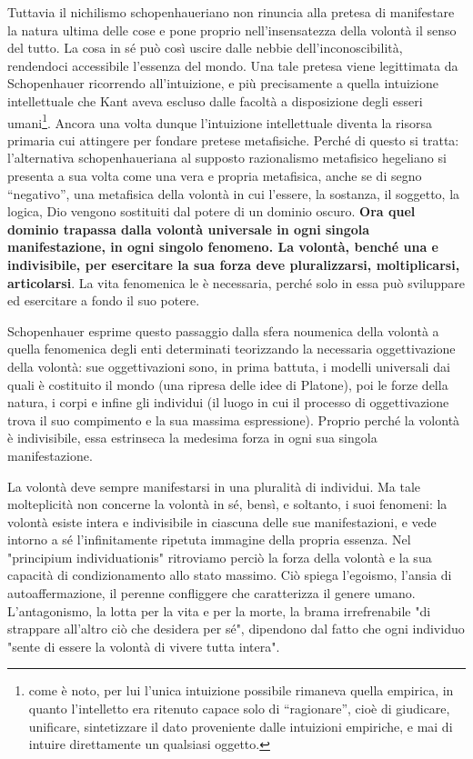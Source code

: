 Tuttavia il nichilismo schopenhaueriano non rinuncia alla pretesa di manifestare la natura ultima delle cose e pone proprio nell’insensatezza della volontà il senso del tutto. La cosa in sé può così uscire dalle nebbie dell’inconoscibilità, rendendoci accessibile l’essenza del mondo. Una tale pretesa viene legittimata da Schopenhauer ricorrendo all’intuizione, e più precisamente a quella intuizione intellettuale che Kant aveva escluso dalle facoltà a disposizione degli esseri umani\footnote{come è noto, per lui l’unica intuizione possibile rimaneva quella empirica, in quanto l’intelletto era ritenuto capace solo di “ragionare”, cioè di giudicare, unificare, sintetizzare il dato proveniente dalle intuizioni empiriche, e mai di intuire direttamente un qualsiasi oggetto.}.
Ancora una volta dunque l’intuizione intellettuale diventa la risorsa primaria cui attingere per fondare pretese metafisiche. Perché di questo si tratta: l’alternativa schopenhaueriana al supposto razionalismo metafisico hegeliano si presenta a sua volta come una vera e propria metafisica, anche se di segno “negativo”, una metafisica della volontà in cui l’essere, la sostanza, il soggetto, la logica, Dio vengono sostituiti dal potere di un dominio oscuro. \textbf{Ora quel dominio trapassa dalla volontà universale in ogni singola manifestazione, in ogni singolo fenomeno. La volontà, benché una e indivisibile, per esercitare la sua forza deve pluralizzarsi, moltiplicarsi, articolarsi}. La vita fenomenica le è necessaria, perché solo in essa può sviluppare ed esercitare a fondo il suo potere. 

Schopenhauer esprime questo passaggio dalla sfera noumenica della volontà a quella fenomenica degli enti determinati teorizzando la necessaria oggettivazione della volontà: sue oggettivazioni sono, in prima battuta, i modelli universali dai quali è costituito il mondo (una ripresa delle idee di Platone), poi le forze della natura, i corpi e infine gli individui (il luogo in cui il processo di oggettivazione trova il suo compimento e la sua massima espressione). Proprio perché la volontà è indivisibile, essa estrinseca la medesima forza in ogni sua singola manifestazione. 

La volontà deve sempre manifestarsi in una pluralità di individui. Ma tale molteplicità non concerne la volontà in sé, bensì, e soltanto, i suoi fenomeni: la volontà esiste intera e indivisibile in ciascuna delle sue manifestazioni, e vede intorno a sé l’infinitamente ripetuta immagine della propria essenza. Nel "principium individuationis" ritroviamo perciò la forza della volontà e la sua capacità di condizionamento allo stato massimo. Ciò spiega l’egoismo, l’ansia di autoaffermazione, il perenne confliggere che caratterizza il genere umano. L’antagonismo, la lotta per la vita e per la morte, la brama irrefrenabile "di strappare all’altro ciò che desidera per sé", dipendono dal fatto che ogni individuo "sente di essere la volontà di vivere tutta intera". 

